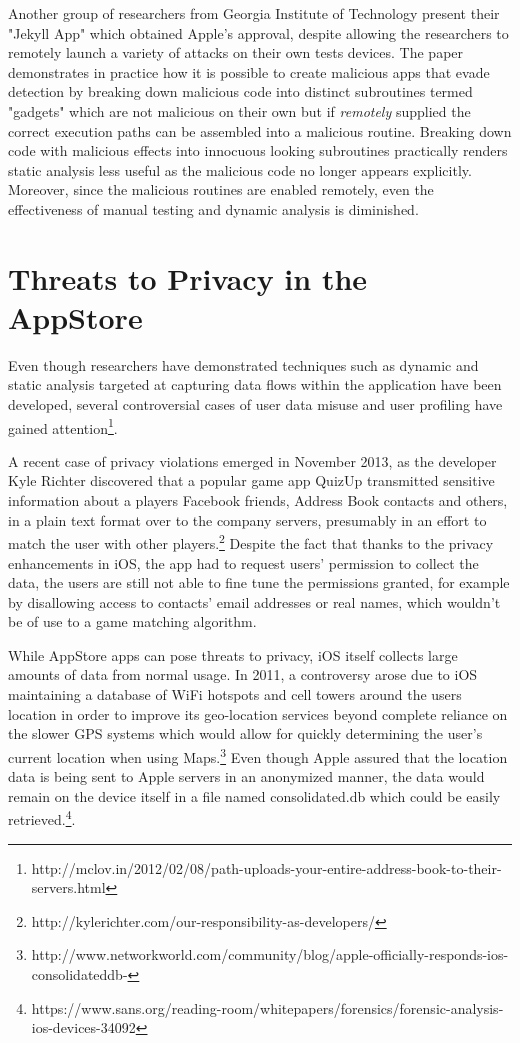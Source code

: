 \documentclass[12pt, titlepage, oneside]{article}
\begin{document}
Another group of researchers from Georgia Institute of Technology present\cite{jekyll} their "Jekyll App" which obtained Apple's approval, despite allowing the researchers to remotely launch a variety of attacks on their own tests devices. The paper demonstrates in practice how it is possible to create malicious apps that evade detection by breaking down malicious code into distinct subroutines termed "gadgets" which are not malicious on their own but if  \emph{remotely} supplied the correct execution paths can be assembled into a malicious routine. Breaking down code with malicious effects into innocuous looking subroutines practically renders static analysis less useful as the malicious code no longer appears explicitly. Moreover, since the malicious routines are enabled remotely, even the effectiveness of manual testing and dynamic analysis is diminished. 

\section{Threats to Privacy in the AppStore}
Even though researchers have demonstrated techniques such as dynamic \cite{dynamic} and static \cite{pios} analysis targeted at capturing data flows within the application have been developed, several controversial cases of user data misuse and user profiling have gained attention\footnote{http://mclov.in/2012/02/08/path-uploads-your-entire-address-book-to-their-servers.html}. 

A recent case of privacy violations emerged in November 2013, as the developer Kyle Richter discovered that a popular game app QuizUp transmitted sensitive information about a players Facebook friends, Address Book contacts and others, in a plain text format over to the company servers, presumably in an effort to match the user with other players.\footnote{http://kylerichter.com/our-responsibility-as-developers/} Despite the fact that thanks to the privacy enhancements in iOS, the app had to request users' permission to collect the data, the users are still not able to fine tune the permissions granted, for example by disallowing access to contacts' email addresses or real names, which wouldn't be of use to a game matching algorithm.

While AppStore apps can pose threats to privacy, iOS itself collects large amounts of data from normal usage.
In 2011, a controversy arose due to iOS maintaining a database of WiFi hotspots and cell towers around the users location in order to improve its geo-location services beyond complete reliance on the slower GPS systems which would allow for quickly determining the user's current location when using Maps.\footnote{http://www.networkworld.com/community/blog/apple-officially-responds-ios-consolidateddb-} Even though Apple assured that the location data is being sent to Apple servers in an anonymized manner, the data would remain on the device itself in a file named consolidated.db which could be easily retrieved.\footnote{https://www.sans.org/reading-room/whitepapers/forensics/forensic-analysis-ios-devices-34092}. 
\end{document}
